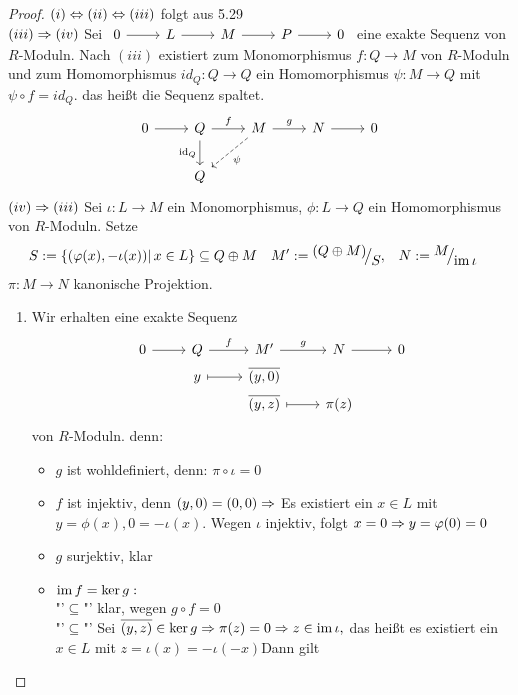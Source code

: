 \begin{proof}
	$(i) \Leftrightarrow (ii) \Leftrightarrow (iii) $ folgt aus 5.29 \\
	$(iii) \Rightarrow (iv) $ Sei $\begin{tikzcd}
	0  \arrow{r} & L \arrow{r} & M \arrow{r} & P \arrow{r} & 0
	\end{tikzcd} $ eine exakte Sequenz von $R$-Moduln.
	Nach $(iii)$ existiert zum Monomorphismus $f: Q \to M $ von $R$-Moduln und zum Homomorphismus $ id_Q : Q \to Q $ ein Homomorphismus $\psi: M \to Q$ mit $ \psi \circ f = id_Q $. das heißt die Sequenz spaltet.
	$$\begin{tikzcd}
	0\arrow{r} & Q \arrow[swap]{d}{\id_Q} \arrow{r}{f} & M \arrow[dashed]{dl}{\psi} \arrow{r}{g} & N \arrow{r} & 0\\& Q & & &
	\end{tikzcd}
	$$ 
	$(iv) \Rightarrow (iii) $ Sei $\iota : L \to M $ ein Monomorphismus, $ \phi: L \to Q $ ein Homomorphismus von $R$-Moduln. Setze 
 \begin{align*} S &:= \{ (\phi(x), - \iota(x))| \, x \in L\} \subseteq Q \oplus M & M' &:= \QR{(Q \oplus M)}{S},& N &:= \QR{M}{\im \iota}\end{align*} $\pi: M \to N$  kanonische Projektion. 
	\begin{enumerate}
		\item  Wir erhalten eine exakte Sequenz
		 $$\begin{tikzcd}[row sep = 0.1ex]	0  \arrow{r} & Q \arrow{r}{f} & M' \arrow{r}{g} & N \arrow{r} & 0 \\
		 & y \arrow[mapsto]{r} & \bar{(y,0)} & & \\
		 & & \bar{(y,z)} \arrow[mapsto]{r} & \pi(z) & 
		\end{tikzcd} $$
		 von $R$-Moduln. denn: 
			\begin{itemize}
			\item $g$ ist wohldefiniert, denn: $\pi \circ \iota = 0$
			\item $f$ ist injektiv, denn $ (y,0) = (0,0)  \Rightarrow $ Es existiert ein $ x \in L $ mit $ y= \phi(x), 0 = - \iota(x)$. Wegen $\iota$ injektiv, folgt $ x = 0 \Rightarrow y = \varphi(0) = 0 $
			\item $g$ surjektiv, klar
			\item $\operatorname{im} f = \ker g: $\\ "'$\subseteq$"' klar, wegen $g \circ f = 0 $\\ 
			"'$\subseteq$"' Sei $\overline{(y,z)} \in \ker g \Rightarrow \pi(z) = 0 \Rightarrow z \in \operatorname{im} \iota,$ das heißt es existiert ein $ x \in L $  mit $ z = \iota(x) = -\iota(-x)$Dann gilt

\end{itemize}
\end{enumerate}
\end{proof}
